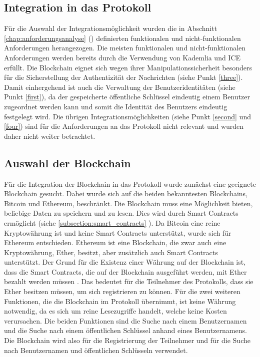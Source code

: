 \subsection{Integration in das Protokoll}

Für die Auswahl der Integrationsmöglichkeit wurden die in Abschnitt \ref{chap:anforderungsanalyse} (\textit{}) definierten funktionalen und nicht-funktionalen Anforderungen herangezogen. Die meisten funktionalen und nicht-funktionalen Anforderungen werden bereits durch die Verwendung von Kademlia und ICE erfüllt. Die Blockchain eignet sich wegen ihrer Manipulationssicherheit besonders für die Sicherstellung der Authentizität der Nachrichten (siehe Punkt \ref{three}). Damit einhergehend ist auch die Verwaltung der Benutzeridentitäten (siehe Punkt \ref{first}), da der gespeicherte öffentliche Schlüssel eindeutig einem Benutzer zugeordnet werden kann und somit die Identität des Benutzers eindeutig festgelegt wird. Die übrigen Integrationsmöglichkeiten (siehe Punkt \ref{second} und \ref{four}) sind für die Anforderungen an das Protokoll nicht relevant und wurden daher nicht weiter betrachtet.


\subsection{Auswahl der Blockchain}

Für die Integration der Blockchain in das Protokoll wurde zunächst eine geeignete Blockchain gesucht. Dabei wurde sich auf die beiden bekanntesten Blockchains, Bitcoin und Ethereum, beschränkt. Die Blockchain muss eine Möglichkeit bieten, beliebige Daten zu speichern und zu lesen. Dies wird durch Smart Contracts ermöglicht (siehe \ref{subsection:smart_contracts} \textit{}). Da Bitcoin eine reine Kryptowährung ist und keine Smart Contracts unterstützt, wurde sich für Ethereum entschieden. Ethereum ist eine Blockchain, die zwar auch eine Kryptowährung, Ether, besitzt, aber zusätzlich auch Smart Contracts unterstützt. Der Grund für die Existenz einer Währung auf der Blockchain ist, dass die Smart Contracts, die auf der Blockchain ausgeführt werden, mit Ether bezahlt werden müssen \parencite[S. 2]{Antonopoulos_MasteringEthereum}. Das bedeutet für die Teilnehmer des Protokolls, dass sie Ether besitzen müssen, um sich registrieren zu können. Für die zwei weiteren Funktionen, die die Blockchain im Protokoll übernimmt, ist keine Währung notwendig, da es sich um reine Lesezugriffe handelt, welche keine Kosten verursachen. Die beiden Funktionen sind die Suche nach einem Benutzernamen und die Suche nach einem öffentlichen Schlüssel anhand eines Benutzernamens. Die Blockchain wird also für die Registrierung der Teilnehmer und für die Suche nach Benutzernamen und öffentlichen Schlüsseln verwendet.



